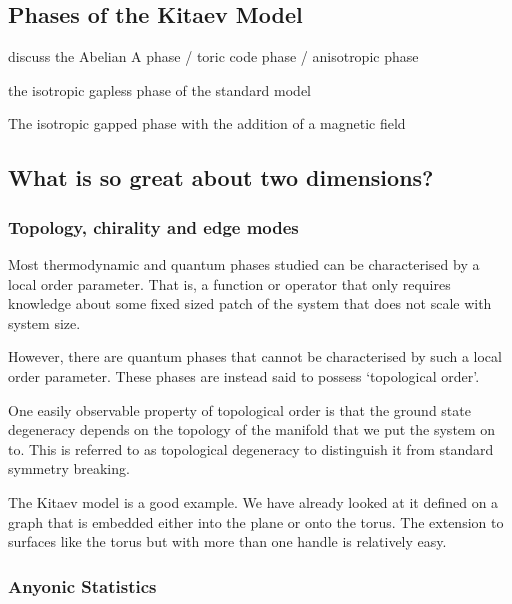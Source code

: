 \hypertarget{phases-of-the-kitaev-model}{%
\subsection{Phases of the Kitaev Model}\label{phases-of-the-kitaev-model}}

discuss the Abelian A phase / toric code phase / anisotropic phase

the isotropic gapless phase of the standard model

The isotropic gapped phase with the addition of a magnetic field

\hypertarget{what-is-so-great-about-two-dimensions}{%
\subsection{What is so great about two dimensions?}\label{what-is-so-great-about-two-dimensions}}

\hypertarget{topology-chirality-and-edge-modes}{%
\subsubsection{Topology, chirality and edge modes}\label{topology-chirality-and-edge-modes}}

Most thermodynamic and quantum phases studied can be characterised by a local order parameter. That is, a function or operator that only requires knowledge about some fixed sized patch of the system that does not scale with system size.

However, there are quantum phases that cannot be characterised by such a local order parameter. These phases are instead said to possess `topological order'.

One easily observable property of topological order is that the ground state degeneracy depends on the topology of the manifold that we put the system on to. This is referred to as topological degeneracy to distinguish it from standard symmetry breaking.

The Kitaev model is a good example. We have already looked at it defined on a graph that is embedded either into the plane or onto the torus. The extension to surfaces like the torus but with more than one handle is relatively easy.

\hypertarget{anyonic-statistics}{%
\subsubsection{Anyonic Statistics}\label{anyonic-statistics}}

